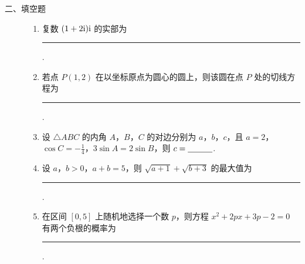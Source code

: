 \begin{description}

    \item[二、填空题]

    \begin{enumerate}[leftmargin=5pt]

      \addtocounter{enumi}{+10}

        \item 复数 \((1 + 2\mathrm{i})\mathrm{i}\) 的实部为\rule[-0.3ex]{3em}{0.4pt}.

        \item 若点 \(P(1,2)\) 在以坐标原点为圆心的圆上，则该圆在点 \(P\) 处的切线方程为\rule[-0.3ex]{3em}{0.4pt}.

        \item 设 \(\triangle ABC\) 的内角 \(A\)，\(B\)，\(C\) 的对边分别为 \(a\)，\(b\)，\(c\)，且 \(a = 2\)，\(\cos C = -\frac{1}{4}\)，\(3\sin A = 2\sin B\)，则 \(c =\rule[-0.3ex]{3em}{0.4pt}\).

        \item 设 \(a\)，\(b > 0\)，\(a + b = 5\)，则 \(\sqrt{a + 1} + \sqrt{b + 3}\) 的最大值为\rule[-0.3ex]{3em}{0.4pt}.

        \item 在区间 \([0, 5]\) 上随机地选择一个数 \(p\)，则方程 \(x^2 + 2px + 3p - 2 = 0\) 有两个负根的概率为\rule[-0.3ex]{3em}{0.4pt}.

    \end{enumerate}

\end{description}

